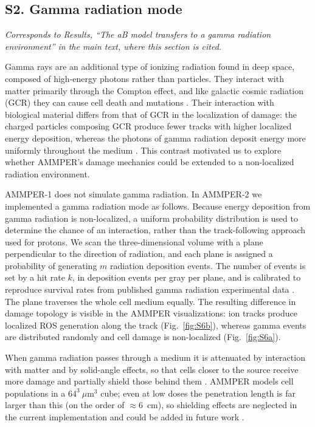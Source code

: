 \documentclass[11pt]{article}
\begin{document}
\subsection{S2. Gamma radiation mode}
\label{sec:gamma}

\textit{Corresponds to Results, ``The aB model transfers to a gamma radiation
environment'' in the main text, where this section is cited.}

Gamma rays are an additional type of ionizing radiation found in deep space,
composed of high-energy photons rather than particles. They interact with matter
primarily through the Compton effect, and like galactic cosmic radiation (GCR)
they can cause cell death and mutations
\citep{hochanadel1952effects, min2003gamma}. Their interaction with biological
material differs from that of GCR in the localization of damage: the charged
particles composing GCR produce fewer tracks with higher localized energy
deposition, whereas the photons of gamma radiation deposit energy more uniformly
throughout the medium \citep{terato2014quantitative}. This contrast motivated us
to explore whether AMMPER's damage mechanics could be extended to a
non-localized radiation environment.

AMMPER-1 does not simulate gamma radiation. In AMMPER-2 we implemented a gamma
radiation mode as follows. Because energy deposition from
gamma radiation is non-localized, a uniform probability distribution is used to
determine the chance of an interaction, rather than the track-following approach
used for protons. We scan the three-dimensional volume with a plane
perpendicular to the direction of radiation, and each plane is assigned a
probability of generating $m$ radiation deposition events. The number of events
is set by a hit rate $k$, in deposition events per gray per plane, and is
calibrated to reproduce survival rates from published gamma radiation
experimental data \citep{brennan2001persistent}. The plane traverses the whole
cell medium equally. The resulting difference in damage topology is visible in the
AMMPER visualizations: ion tracks produce localized ROS generation along the
track (Fig.~\ref{fig:S6b}), whereas gamma events are distributed randomly and
cell damage is non-localized (Fig.~\ref{fig:S6a}).

When gamma radiation passes through a medium it is attenuated by interaction
with matter and by solid-angle effects, so that cells closer to the source
receive more damage and partially shield those behind them
\citep{international2006icnirp, ash2017effect}. AMMPER models cell populations
in a $64^3~\mu\mathrm{m}^3$ cube; even at low doses the penetration length is
far larger than this (on the order of ${\approx}6$~cm), so shielding effects are
neglected in the current implementation and could be added in future work
\citep{cohen2003aip, knoll2010radiation, morgan1948some, l2012handbook, wapstra1959nuclear}.
\end{document}
